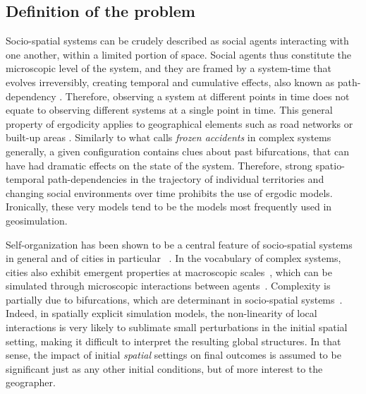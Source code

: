 \documentclass{JASSS}
\begin{document}
\subsection{Definition of the problem}

Socio-spatial systems can be crudely described as social agents interacting with one another, within a limited portion of space. Social agents thus constitute the microscopic level of the system, and they are framed by a system-time that evolves irreversibly, creating temporal and cumulative effects, also known as path-dependency \citep{arthur1994increasing}. Therefore, observing a system at different points in time does not equate to observing different systems at a single point in time. This general property of ergodicity applies to geographical elements such as road networks or built-up areas \citep{pumain2003approche}. Similarly to what \citet{gell1995quark} calls \emph{frozen accidents} in complex systems generally, a given configuration contains clues about past bifurcations, that can have had dramatic effects on the state of the system. Therefore, strong spatio-temporal path-dependencies in the trajectory of individual territories and changing social environments over time prohibits the use of ergodic models. Ironically, these very models tend to be the models most frequently used in geosimulation.


Self-organization has been shown to be a central feature of socio-spatial systems in general and of cities in particular ~\citep{AllenSanglier1981,saint1989villes, Portugali2000}. In the vocabulary of complex systems, cities also exhibit emergent properties at macroscopic scales~\citep{pumain2006hierarchy, AzizAlaouiBertelle2009}, which can be simulated through microscopic interactions between agents~\citep{Wu2002, batty2007cities}. Complexity is partially due to bifurcations, which are determinant in socio-spatial systems~\citep{Wilson1981, Wilson2002}. Indeed, in spatially explicit simulation models, the non-linearity of local interactions is very likely to sublimate small perturbations in the initial spatial setting, making it difficult to interpret the resulting global structures. In that sense, the impact of initial \emph{spatial} settings on final outcomes is assumed to be significant just as any other initial conditions, but of more interest to the geographer. \\
\end{document}
